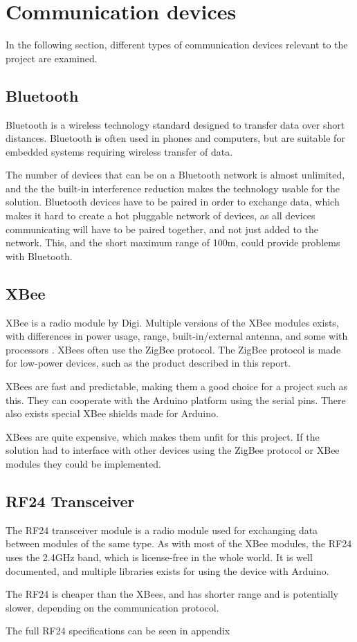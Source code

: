 \section{Communication devices}
In the following section, different types of communication devices relevant to the project are examined.

\subsection{Bluetooth}
Bluetooth is a wireless technology standard designed to transfer data over short distances\cite{bluetoothbasics}. Bluetooth is often used in phones and computers, but are suitable for embedded systems requiring wireless transfer of data.

The number of devices that can be on a Bluetooth network is almost unlimited, and the the built-in interference reduction makes the technology usable for the solution\cite{bluetoothbasics}.
Bluetooth devices have to be paired in order to exchange data, which makes it hard to create a hot pluggable network of devices, as all devices communicating will have to be paired together, and not just added to the network. 
This, and the short maximum range of 100m\cite{bluetoothbasics}, could provide problems with Bluetooth.

\subsection{XBee}
XBee is a radio module by Digi. Multiple versions of the XBee modules exists, with differences in power usage, range, built-in/external antenna, and some with processors \cite{sparkfunXbeeGuide}.
XBees often use the ZigBee protocol. The ZigBee protocol is made for low-power devices, such as the product described in this report\cite{zigbee}.

XBees are fast and predictable, making them a good choice for a project such as this. They can cooperate with the Arduino platform using the serial pins. There also exists special XBee shields made for Arduino.

XBees are quite expensive, which makes them unfit for this project. If the solution had to interface with other devices using the ZigBee protocol or XBee modules they could be implemented.

\subsection{RF24 Transceiver}
The RF24 transceiver module is a radio module used for exchanging data between modules of the same type. As with most of the XBee modules, the RF24 uses the 2.4GHz band, which is license-free in the whole world. It is well documented, and multiple libraries exists for using the device with Arduino.

The RF24 is cheaper than the XBees, and has shorter range and is potentially slower, depending on the communication protocol.

The full RF24 specifications can be seen in appendix 

